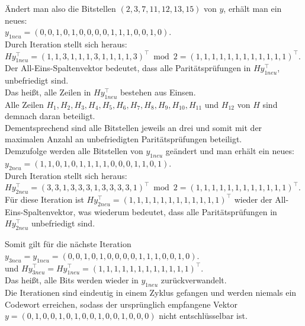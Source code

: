 \begin{Beispiel}
        Ändert man also die Bitstellen $(2, 3, 7, 11, 12, 13, 15)$ von $y$, erhält man ein neues:\\
        $y_{1neu} = (0,0,1,0,1,0,0,0,0,1,1,1,0,0,1,0).$\\
        
        Durch Iteration stellt sich heraus:\\
        $Hy_{1neu}^\intercal = (1,1,3,1,1,1,3,1,1,1,1,3)^\intercal \bmod 2 =(1,1,1,1,1,1,1,1,1,1,1,1)^\intercal.$\\
        
        Der All-Eins-Spaltenvektor bedeutet, dass alle Paritätsprüfungen in $Hy_{1neu}^\intercal$, unbefriedigt sind.\\ 
        Das hei\ss{}t, alle Zeilen in $Hy_{1neu}^\intercal$ bestehen aus Einsen.\\
        Alle Zeilen $H_1, H_2, H_3, H_4, H_5, H_6, H_7, H_8, H_9, H_{10}, H_{11}$ und $H_{12}$ von $H$ sind demnach daran beteiligt.\\
        Dementsprechend sind alle Bitstellen jeweils an drei und somit mit der maximalen Anzahl an unbefriedigten Paritätsprüfungen beteiligt.\\
        
        Demzufolge werden alle Bitstellen von $y_{1neu}$ geändert und man erhält ein neues:\\
        $y_{2neu} = (1,1,0,1,0,1,1,1,1,0,0,0,1,1,0,1).$\\
        
        Durch Iteration stellt sich heraus:\\
        $Hy_{2neu}^\intercal = (3,3,1,3,3,3,1,3,3,3,3,1)^\intercal \bmod 2 =(1,1,1,1,1,1,1,1,1,1,1,1)^\intercal.$\\
        
        Für diese Iteration ist $Hy_{2neu}^\intercal = (1,1,1,1,1,1,1,1,1,1,1,1)^\intercal$ 
        wieder der All-Eins-Spaltenvektor, was wiederum bedeutet, 
        dass alle Paritätsprüfungen in $Hy_{2neu}^\intercal$ unbefriedigt sind.
         
        Somit gilt für die nächste Iteration $y_{3neu} = y_{1neu} = (0,0,1,0,1,0,0,0,0,1,1,1,0,0,1,0).$\\ 
        und $Hy_{3neu}^\intercal = Hy_{1neu}^\intercal = (1,1,1,1,1,1,1,1,1,1,1,1)^\intercal$.\\ 
        Das hei\ss{}t, alle Bits werden wieder in $y_{1neu}$ zurückverwandelt.\\
        Die Iterationen sind eindeutig in einem Zyklus gefangen und werden niemals ein Codewort erreichen, 
        sodass der ursprünglich empfangene Vektor $y = (0,1,0,0,1,0,1,0,0,1,0,0,1,0,0,0)$ nicht entschlüsselbar ist.\\
        
    \end{Beispiel}
    
